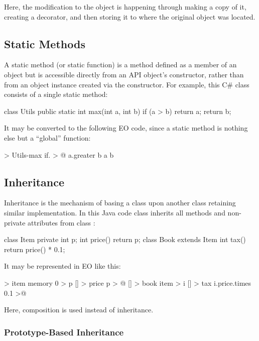 \documentclass[sigplan,11pt,nonacm,natbib=false]{acmart}
\begin{document}
Here, the modification to the object  is happening through making a copy of it, creating a decorator, and then storing it to where the original object was located.

\subsection{Static Methods}
\label{sec:static}

A static method (or static function) is a method defined as a member of an object but is accessible directly from an API object's constructor, rather than from an object instance created via the constructor. For example, this C\# class consists of a single static method:

\begin{ffcode}
class Utils {  
  public static int max(int a, int b) {
    if (a > b) return a;
    return b;
  }
}  
\end{ffcode}

It may be converted to the following EO code, since a static method is nothing else but a ``global'' function:

\begin{ffcode}
[a b] > Utils-max
  if. > @
    a.greater b
    a
    b
\end{ffcode}

\subsection{Inheritance}
\label{sec:inheritance}

Inheritance is the mechanism of basing a class upon another class retaining similar implementation. In this Java code class  inherits all methods and non-private attributes from class :

\begin{ffcode}
class Item {
  private int p;
  int price() { return p; }
}
class Book extends Item {
  int tax() { return price() * 0.1; }
}
\end{ffcode}

It may be represented in EO like this:

\begin{ffcode}
[] > item
  memory 0 > p
  [] > price
    p > @
[] > book
  item > i
  [] > tax
    i.price.times 0.1  >@
\end{ffcode}

Here, composition is used instead of inheritance.

\subsubsection{Prototype-Based Inheritance}
\end{document}
